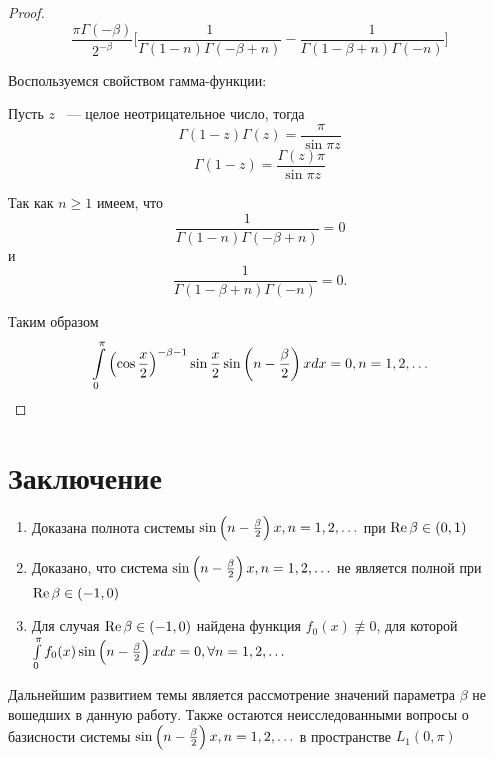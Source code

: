 ﻿\documentclass[oneside, final, 14pt]{extreport}
\begin{document}
\begin{proof}
		$$
			\frac{\pi\Gamma(-\beta)}{2^{-\beta}}\Bigg[\frac{1}{\Gamma(1 - n)\Gamma(-\beta + n)} - 
			\frac{1}{\Gamma(1 -\beta + n)\Gamma(- n)}\Bigg]
		$$
		
		Воспользуемся свойством гамма-функции: 
		
		Пусть $z$ ~--- целое неотрицательное число, тогда
		$$
			\Gamma(1 - z)\Gamma(z) = \frac{\pi}{\sin\pi z}
		$$
		$$
			\Gamma(1 - z) = \frac{\Gamma(z)\pi}{\sin\pi z} 
		$$
		
		\bigskip
		Так как $n \geq 1$ имеем, что 
		$$\frac{1}{\Gamma(1 - n)\Gamma(-\beta + n)} = 0$$ и
		$$\frac{1}{\Gamma(1 -\beta + n)\Gamma(- n)} = 0.$$ 
		
		Таким образом 
		$$
			\int\limits_0^\pi\left(\cos\frac{x}{2}\right)^{-\beta-1}\sin\frac{x}{2}\sin\left(n - \frac{\beta}{2}\right)xdx = 0, n = 1, 2, \ldots 
		$$
		
	\end{proof}




	
\chapter*{Заключение}
\begin{enumerate}
	\item Доказана полнота системы $\sin\left(n - \frac{\beta}{2}\right)x, n = 1, 2, \ldots$ при $\operatorname{Re}{\beta}\in(0, 1)$
	\item Доказано, что система $\sin\left(n - \frac{\beta}{2}\right)x, n = 1, 2, \ldots$ не является полной при $\operatorname{Re}{\beta}\in(-1, 0)$
	\item Для случая $\operatorname{Re}{\beta}\in(-1, 0)$ найдена функция $f_0(x) \not\equiv 0$, для которой \\
		$\int\limits_0^\pi f_0(x)\sin\left(n - \frac{\beta}{2}\right)xdx = 0, \forall n = 1, 2, \ldots$
\end{enumerate}

\bigskip
Дальнейшим развитием темы является рассмотрение значений параметра $\beta$ не вошедших в данную работу.
Также остаются неисследованными вопросы о базисности системы 
$\sin\left(n - \frac{\beta}{2}\right)x, n = 1, 2, \ldots$ в пространстве $L_1(0, \pi)$
\end{document}
